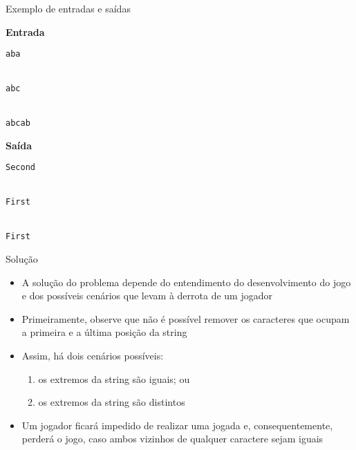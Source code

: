 \begin{frame}[fragile]{Exemplo de entradas e saídas}

\begin{minipage}[t]{0.55\textwidth}
\textbf{Entrada}
\begin{verbatim}
aba


abc


abcab
\end{verbatim}
\end{minipage}
\begin{minipage}[t]{0.4\textwidth}
\textbf{Saída}
\begin{verbatim}
Second


First


First
\end{verbatim}
\end{minipage}
\end{frame}

\begin{frame}[fragile]{Solução}

    \begin{itemize}
        \item A solução do problema depende do entendimento do desenvolvimento do jogo e 
            dos possíveis cenários que levam à derrota de um jogador

        \item Primeiramente, observe que não é possível remover os caracteres que ocupam a
            primeira e a última posição da string

        \item Assim, há dois cenários possíveis:
        \begin{enumerate}
            \item os extremos da string são iguais; ou
            \item os extremos da string são distintos
        \end{enumerate}

        \item Um jogador ficará impedido de realizar uma jogada e, consequentemente, perderá
            o jogo, caso ambos vizinhos de qualquer caractere sejam iguais

    \end{itemize}

\end{frame}


